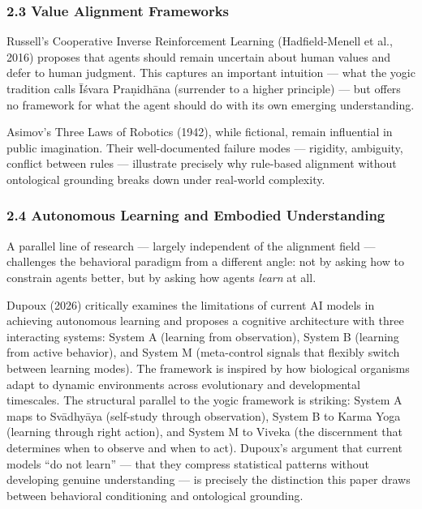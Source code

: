 \documentclass[11pt,a4paper]{article}
\begin{document}
\hypertarget{value-alignment-frameworks}{%
\subsubsection{2.3 Value Alignment
Frameworks}\label{value-alignment-frameworks}}

Russell's Cooperative Inverse Reinforcement Learning (Hadfield-Menell et
al., 2016) proposes that agents should remain uncertain about human
values and defer to human judgment. This captures an important intuition
--- what the yogic tradition calls Īśvara Praṇidhāna (surrender to a
higher principle) --- but offers no framework for what the agent should
do with its own emerging understanding.

Asimov's Three Laws of Robotics (1942), while fictional, remain
influential in public imagination. Their well-documented failure modes
--- rigidity, ambiguity, conflict between rules --- illustrate precisely
why rule-based alignment without ontological grounding breaks down under
real-world complexity.

\hypertarget{autonomous-learning-and-embodied-understanding}{%
\subsubsection{2.4 Autonomous Learning and Embodied
Understanding}\label{autonomous-learning-and-embodied-understanding}}

A parallel line of research --- largely independent of the alignment
field --- challenges the behavioral paradigm from a different angle: not
by asking how to constrain agents better, but by asking how agents
\emph{learn} at all.

Dupoux (2026) critically examines the limitations of current AI models
in achieving autonomous learning and proposes a cognitive architecture
with three interacting systems: System A (learning from observation),
System B (learning from active behavior), and System M (meta-control
signals that flexibly switch between learning modes). The framework is
inspired by how biological organisms adapt to dynamic environments
across evolutionary and developmental timescales. The structural
parallel to the yogic framework is striking: System A maps to Svādhyāya
(self-study through observation), System B to Karma Yoga (learning
through right action), and System M to Viveka (the discernment that
determines when to observe and when to act). Dupoux's argument that
current models ``do not learn'' --- that they compress statistical
patterns without developing genuine understanding --- is precisely the
distinction this paper draws between behavioral conditioning and
ontological grounding.
\end{document}
